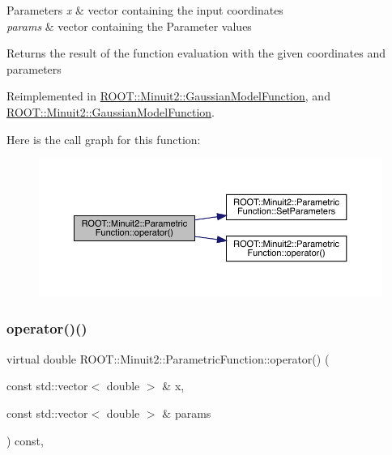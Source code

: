 \begin{DoxyParams}{Parameters}
{\em x} & vector containing the input coordinates\\
\hline
{\em params} & vector containing the Parameter values\\
\hline
\end{DoxyParams}
\begin{DoxyReturn}{Returns}
the result of the function evaluation with the given coordinates and parameters 
\end{DoxyReturn}


Reimplemented in \mbox{\hyperlink{classROOT_1_1Minuit2_1_1GaussianModelFunction_ab74ced8f50ef3831c8142de54877e726}{R\+O\+O\+T\+::\+Minuit2\+::\+Gaussian\+Model\+Function}}, and \mbox{\hyperlink{classROOT_1_1Minuit2_1_1GaussianModelFunction_ab74ced8f50ef3831c8142de54877e726}{R\+O\+O\+T\+::\+Minuit2\+::\+Gaussian\+Model\+Function}}.

Here is the call graph for this function\+:
\nopagebreak
\begin{figure}[H]
\begin{center}
\leavevmode
\includegraphics[width=350pt]{d3/d76/classROOT_1_1Minuit2_1_1ParametricFunction_a5fab6e804e0f93bd593580f582b0f7c5_cgraph}
\end{center}
\end{figure}
\mbox{\label{classROOT_1_1Minuit2_1_1ParametricFunction_a5fab6e804e0f93bd593580f582b0f7c5}} 
\subsubsection{\texorpdfstring{operator()()}{operator()()}\hspace{0.1cm}{\footnotesize\ttfamily [5/6]}}
{\footnotesize\ttfamily virtual double R\+O\+O\+T\+::\+Minuit2\+::\+Parametric\+Function\+::operator() (\begin{DoxyParamCaption}\item[{const std\+::vector$<$ double $>$ \&}]{x,  }\item[{const std\+::vector$<$ double $>$ \&}]{params }\end{DoxyParamCaption}) const\hspace{0.3cm}{\ttfamily [inline]}, {\ttfamily [virtual]}}


